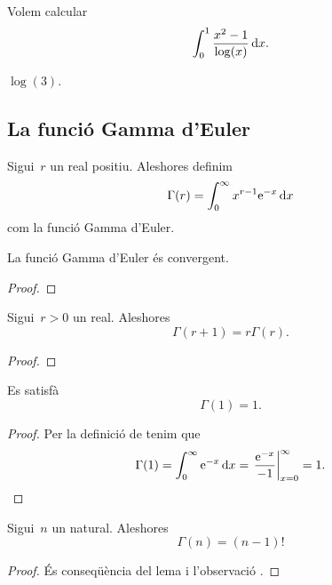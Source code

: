 \documentclass[../../main.tex]{subfiles}
\begin{document}
    \begin{example}
        \label{ex:trobar un valor derivant sota el signe de la integral inventant-se una funció}
        Volem calcular
        \[
            \int_{0}^{1}\frac{x^{2}-1}{\log(x)}\mathop{}\!\mathrm{d} x.
        \]
        \begin{solution}
            \(\log(3)\).
        \end{solution}
    \end{example}
    \subsection{La funció Gamma d'Euler}
    \begin{definition}
        \label{def:Gamma d'Euler}
        Sigui~\(r\) un real positiu.
        Aleshores definim
        \[
            \Gamma(r)=\int_{0}^{\infty}x^{r-1}\mathrm{e}^{-x}\mathop{}\!\mathrm{d} x
        \]
        com la funció Gamma d'Euler.
    \end{definition}
    \begin{theorem}
        \label{thm:la funció Gamma d'Euler és convergent}
        La funció Gamma d'Euler és convergent.
        \begin{proof}
        \end{proof}
    \end{theorem}
    \begin{lemma} %
        \label{lema:la Gamma d'Euler es comporta com un factorial amb reals}
        Sigui~\(r>0\) un real.
        Aleshores
        \[
            \Gamma(r+1)=r\Gamma(r).
        \]
        \begin{proof}
        \end{proof}
    \end{lemma}
    \begin{observation}
        \label{obs:valor n=1 per la Gamma d'Euler}
        Es satisfà
        \[
            \Gamma(1)=1.
        \]
        \begin{proof} %
            Per la definició de  tenim que
            \[
                \Gamma(1)=\int_{0}^{\infty}\e^{-x}\diff x=\left.\frac{\e^{-x}}{-1}\right\vert_{x=0}^{\infty}=1.\qedhere
            \]
        \end{proof}
    \end{observation}
    \begin{lemma} %
        \label{lema:la Gamma d'Euler es comporta com un factorial}
        Sigui~\(n\) un natural.
        Aleshores
        \[
            \Gamma(n)=(n-1)!
        \]
        \begin{proof}
            És conseqüència del lema  i l'observació .
        \end{proof}
    \end{lemma}
\end{document}
